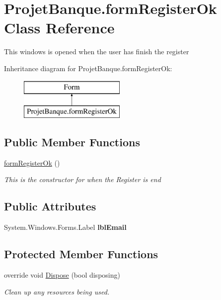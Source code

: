 \hypertarget{class_projet_banque_1_1form_register_ok}{}\section{Projet\+Banque.\+form\+Register\+Ok Class Reference}
\label{class_projet_banque_1_1form_register_ok}


This windows is opened when the user has finish the register  


Inheritance diagram for Projet\+Banque.\+form\+Register\+Ok\+:\begin{figure}[H]
\begin{center}
\leavevmode
\includegraphics[height=2.000000cm]{class_projet_banque_1_1form_register_ok}
\end{center}
\end{figure}
\subsection*{Public Member Functions}
\begin{DoxyCompactItemize}
\item 
\mbox{\hyperlink{class_projet_banque_1_1form_register_ok_a5714d1a5b568d1667927d0908b53bfde}{form\+Register\+Ok}} ()
\begin{DoxyCompactList}\small\item\em This is the constructor for when the Register is end \end{DoxyCompactList}\end{DoxyCompactItemize}
\subsection*{Public Attributes}
\begin{DoxyCompactItemize}
\item 
\mbox{\label{class_projet_banque_1_1form_register_ok_a844d3ce000615c99f42c804208a6b3b5}} 
System.\+Windows.\+Forms.\+Label {\bfseries lbl\+Email}
\end{DoxyCompactItemize}
\subsection*{Protected Member Functions}
\begin{DoxyCompactItemize}
\item 
override void \mbox{\hyperlink{class_projet_banque_1_1form_register_ok_ac7fc952554f8e22d1b45017ea851cb9a}{Dispose}} (bool disposing)
\begin{DoxyCompactList}\small\item\em Clean up any resources being used. \end{DoxyCompactList}\end{DoxyCompactItemize}


